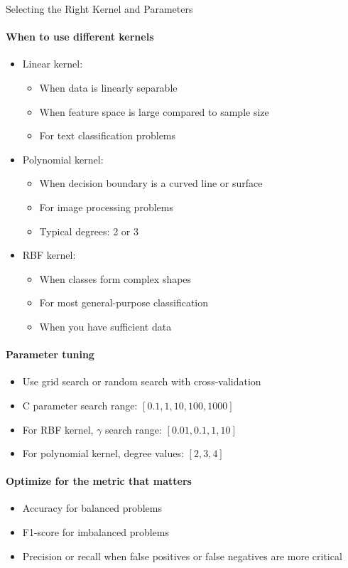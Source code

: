 \begin{KR}{Selecting the Right Kernel and Parameters}
\paragraph{When to use different kernels}
\begin{itemize}
    \item Linear kernel: 
    \begin{itemize}
        \item When data is linearly separable
        \item When feature space is large compared to sample size
        \item For text classification problems
    \end{itemize}
    \item Polynomial kernel:
    \begin{itemize}
        \item When decision boundary is a curved line or surface
        \item For image processing problems
        \item Typical degrees: 2 or 3
    \end{itemize}
    \item RBF kernel:
    \begin{itemize}
        \item When classes form complex shapes
        \item For most general-purpose classification
        \item When you have sufficient data
    \end{itemize}
\end{itemize}

\paragraph{Parameter tuning}
\begin{itemize}
    \item Use grid search or random search with cross-validation
    \item C parameter search range: $[0.1, 1, 10, 100, 1000]$
    \item For RBF kernel, $\gamma$ search range: $[0.01, 0.1, 1, 10]$
    \item For polynomial kernel, degree values: $[2, 3, 4]$
\end{itemize}

\paragraph{Optimize for the metric that matters}
\begin{itemize}
    \item Accuracy for balanced problems
    \item F1-score for imbalanced problems
    \item Precision or recall when false positives or false negatives are more critical
\end{itemize}
\end{KR}

